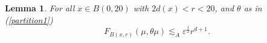 \documentclass[11pt]{amsart}
\newcommand{\LL}{{\mathcal L}}
\newcommand{\rf}[1]{{(\ref{#1})}}
\newcommand{\ve}{{\varepsilon}}
\newcommand{\wt}[1]{{\widetilde{#1}}}
\newtheorem{lemma}[theorem]{Lemma}
\theoremstyle{definition}
\theoremstyle{remark}
\numberwithin{equation}{section}
\def\cH{{\mathcal{H}}}
\def\lec{\lesssim}
\def\lec{\lesssim}
\begin{document}
%
%	

\begin{lemma}
	For all $x\in B(0,20)$ with $2 d(x)<r<20$, and $\theta$ as in \rf{partition1}
	\begin{equation}
	\label{e:mumutheta}
	F_{B(x,r)}(\mu,\theta \mu)\lec_{A} \ve^{\frac{1}{2}} r^{d+1}. 
	\end{equation} 
\end{lemma}
\end{document}
